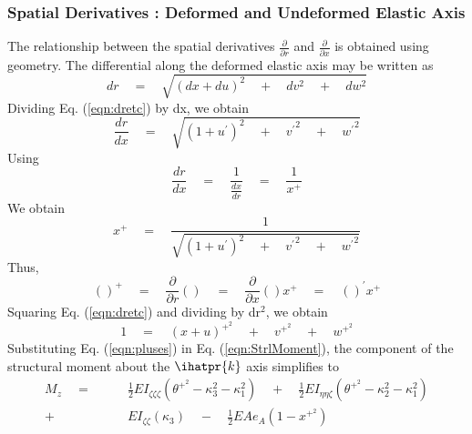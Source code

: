\subsubsection*{Spatial Derivatives : Deformed and Undeformed Elastic Axis}
The relationship between the spatial derivatives $\frac{\partial}{\partial r}$ and $\frac{\partial}{\partial x}$ is obtained using geometry. The differential along the deformed elastic axis may be written as 
\begin{equation}
\label{eqn:dretc}
dr \quad = \quad \sqrt{(dx+du)^2 \quad + \quad dv^2 \quad + \quad dw^2}
\end{equation}
Dividing Eq. (\ref{eqn:dretc}) by dx, we obtain
\[ \frac{dr}{dx} \quad = \quad \sqrt{(1 + u^\prime)^2 \quad + \quad {v^\prime} ^2 \quad + \quad {w^\prime}^2} \]
Using 
\[\frac{dr}{dx} \quad = \quad \frac{1}{\frac{dx}{dr}} \quad = \quad \frac{1}{x^+} \]
We obtain
\begin{equation}
x^+ \quad = \quad \frac{1}{\sqrt{(1 + u^\prime)^2 \quad + \quad {v^\prime}^2 \quad + \quad {w^\prime}^2}}
\end{equation}
Thus,
\begin{equation}
()^+ \quad = \quad \frac{\partial}{\partial r} () \quad = \quad \frac{\partial}{\partial x} () x^+ \quad = \quad ()^\prime x^+
\end{equation}
Squaring Eq. (\ref{eqn:dretc}) and dividing by dr$^2$, we obtain
\begin{equation}
\label{eqn:pluses}
1 \quad = \quad (x+u)^{+^2} \quad + \quad v^{+^2} \quad + \quad w^{+^2} 
\end{equation}
Substituting Eq. (\ref{eqn:pluses}) in Eq. (\ref{eqn:StrlMoment}), the component of the structural moment about the $\ihatpr{k}$ axis simplifies to 
\begin{equation}
\label{eqn:ZmomentStr}
\begin{split}
M_z \quad = \quad & \quad \frac{1}{2} E I_{\zeta \zeta \zeta} \left(\theta^{+^2} - \kappa_3^2 - \kappa_1^2 \right) \quad + \quad \frac{1}{2} E I_{\eta \eta \zeta} \left(\theta^{+^2} - \kappa_2^2 - \kappa_1^2\right) \\
+ & \quad E I_{\zeta \zeta} (\kappa_3) \quad - \quad \frac{1}{2} E A e_A \left( 1 - x^{+^2} \right)
\end{split}
\end{equation}

